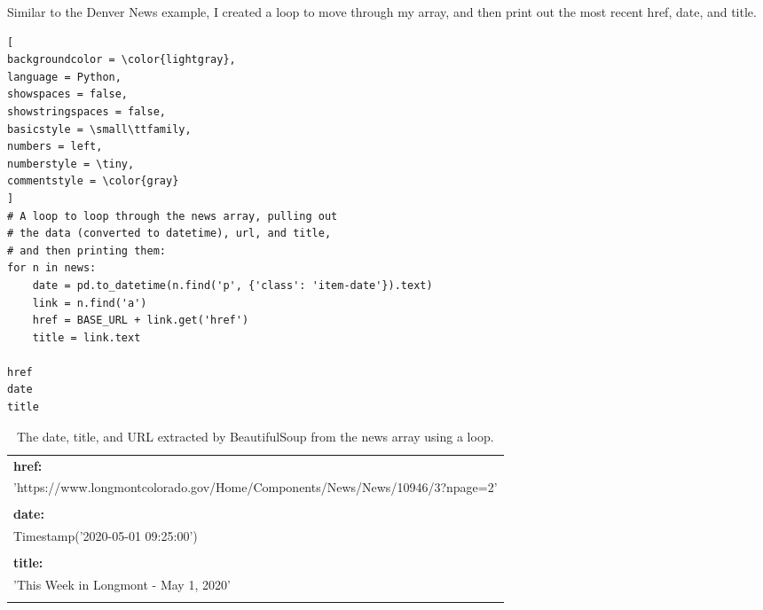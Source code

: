 \documentclass[]{article}
\begin{document}
Similar to the Denver News example, I created a loop to move through my array, and then print out the most recent href, date, and title.

\begin{lstlisting}[
backgroundcolor = \color{lightgray},
language = Python,
showspaces = false,
showstringspaces = false,
basicstyle = \small\ttfamily,
numbers = left,
numberstyle = \tiny,
commentstyle = \color{gray}
]
# A loop to loop through the news array, pulling out
# the data (converted to datetime), url, and title, 
# and then printing them:
for n in news:
	date = pd.to_datetime(n.find('p', {'class': 'item-date'}).text)
	link = n.find('a')
	href = BASE_URL + link.get('href')
	title = link.text
	
href
date
title
\end{lstlisting}

\begin{table}[!ht]
	\begin{center}
		\caption{The date, title, and URL extracted by BeautifulSoup from the news array using a loop.}
		\label{tab:table1}
		\begin{tabular}{|l|} 
			\hline
			\textbf{href:}\\
			'https://www.longmontcolorado.gov/Home/Components/News/News/10946/3?npage=2'\\
			\\
			\hline
			\textbf{date:}\\
			Timestamp('2020-05-01 09:25:00')\\
			\\
			\hline
			\textbf{title:}\\
			'This Week in Longmont - May 1, 2020'\\
			\\
			\hline
		\end{tabular}
	\end{center}
\end{table}
\end{document}
